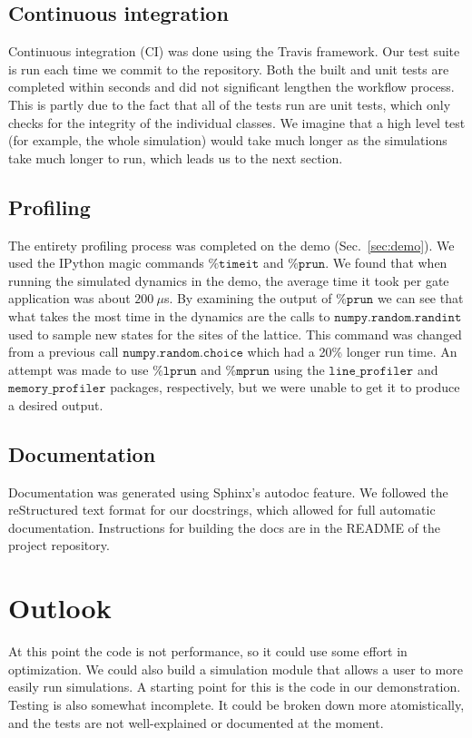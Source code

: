 \documentclass{article}
\begin{document}
\subsection{Continuous integration}
\label{sec:ci}
Continuous integration (CI) was done using the Travis framework. Our test suite is run each time we commit to the repository.  Both the built and unit tests are completed within seconds and did not significant lengthen the workflow process.  This is partly due to the fact that all of the tests run are unit tests, which only checks for the integrity of the individual classes.  We imagine that a high level test (for example, the whole simulation) would take much longer as the simulations take much longer to run, which leads us to the next section.

\subsection{Profiling}
The entirety profiling process was completed on the demo (Sec.~\ref{sec:demo}). We used the IPython magic commands $\texttt{\%timeit}$ and $\texttt{\%prun}$. We found that when running the simulated dynamics in the demo, the average time it took per gate application was about $200\ \mu$s. By examining the output of $\texttt{\%prun}$ we can see that what takes the most time in the dynamics are the calls to $\texttt{numpy.random.randint}$ used to sample new states for the sites of the lattice.  This command was changed from a previous call $\texttt{numpy.random.choice}$ which had a 20\% longer run time.  An attempt was made to use $\texttt{\%lprun}$ and $\texttt{\%mprun}$ using the $\texttt{line\_profiler}$ and $\texttt{memory\_profiler}$ packages, respectively, but we were unable to get it to produce a desired output.

\subsection{Documentation}
Documentation was generated using Sphinx's autodoc feature. We followed the reStructured text format for our docstrings, which allowed for full automatic documentation. Instructions for building the docs are in the README of the project repository.

\section{Outlook}
At this point the code is not performance, so it could use some effort in optimization. We could also build a simulation module that allows a user to more easily run simulations. A starting point for this is the code in our demonstration. Testing is also somewhat incomplete. It could be broken down more atomistically, and the tests are not well-explained or documented at the moment.
\end{document}
